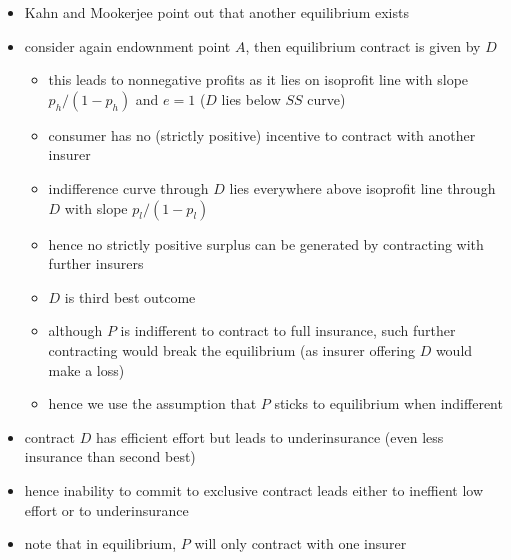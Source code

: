 \documentclass[11pt,english]{beamer}
\begin{document}
\begin{frame}[allowframebreaks]
\begin{itemize}
\item Kahn and Mookerjee point out that another equilibrium exists\\
\label{sec-7-4-6}%
\item consider again endownment point $A$, then equilibrium contract is given by $D$
\label{sec-7-4-7}%
\begin{itemize}

\item this leads to nonnegative profits as it lies on isoprofit line with slope $p_{h}/(1-p_{h})$ and $e=1$ ($D$ lies below $SS$ curve)\\
\label{sec-7-4-7-1}%
\item consumer has no (strictly positive) incentive to contract with another insurer\\
\label{sec-7-4-7-2}%
\item indifference curve through $D$ lies everywhere above isoprofit line through $D$ with slope $p_{l}/(1-p_{l})$\\
\label{sec-7-4-7-3}%
\item hence no strictly positive surplus can be generated by contracting with further insurers\\
\label{sec-7-4-7-4}%
\item $D$ is third best outcome\\
\label{sec-7-4-7-5}%
\item although $P$ is indifferent to contract to full insurance, such further contracting would break the equilibrium (as insurer offering $D$ would make a loss)\\
\label{sec-7-4-7-6}%
\item hence we use the assumption that $P$ sticks to equilibrium when indifferent\\
\label{sec-7-4-7-7}%
\end{itemize} %

\item contract $D$ has efficient effort but leads to underinsurance (even less insurance than second best)\\
\label{sec-7-4-8}%
\item hence inability to commit to exclusive contract leads either to ineffient low effort or to underinsurance\\
\label{sec-7-4-9}%
\item note that in equilibrium, $P$ will only contract with one insurer
\label{sec-7-4-10}%
\begin{itemize}


\end{itemize}
\end{itemize}
\end{frame}
\end{document}
